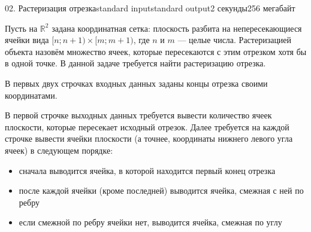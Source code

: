 \begin{problem}{02. Растеризация отрезка}{standard input}{standard output}{2 секунды}{256 мегабайт}

Пусть на $\mathbb R^2$ задана координатная сетка: плоскость разбита на непересекающиеся ячейки вида $[n; n + 1) \times [m; m + 1)$, где $n$ и $m$ --- целые числа. Растеризацией объекта назовём множество ячеек, которые пересекаются с этим отрезком хотя бы в одной точке. В данной задаче требуется найти растеризацию отрезка.

\InputFile

В первых двух строчках входных данных заданы концы отрезка своими координатами.

\OutputFile

В первой строчке выходных данных требуется вывести количество ячеек плоскости, которые пересекает исходный отрезок. Далее требуется на каждой строчке вывести ячейки плоскости (а точнее, координаты нижнего левого угла ячеек) в следующем порядке:
\begin{itemize}
\item сначала выводится ячейка, в которой находится первый конец отрезка
\item после каждой ячейки (кроме последней) выводится ячейка, смежная с ней по ребру
\item если смежной по ребру ячейки нет, выводится ячейка, смежная по углу
\end{itemize}

\Examples

\begin{example}%
%
%
\end{example}

\end{problem}

